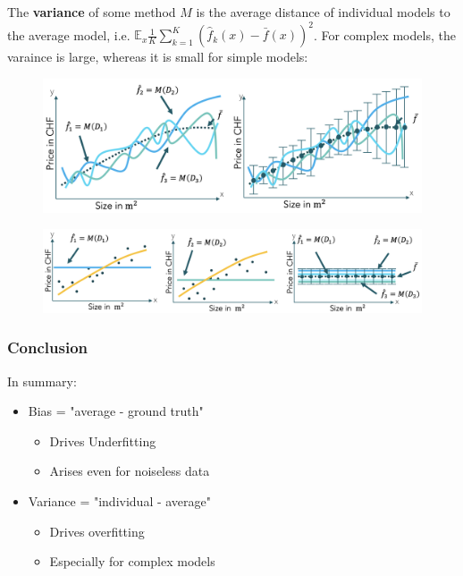 \documentclass[a4paper]{extarticle}
\begin{document}
The \textbf{variance} of some method \(M\) is the average distance of individual models to the average model, i.e. \(\mathbb{E}_x \frac{1}{K}\sum_{k = 1}^K (\hat{f}_k(x) - \bar{f}(x))^2\). For complex models, the varaince is large, whereas it is small for simple models:

\begin{figure}[H]
    \includegraphics[width=15cm]{../images/IntroML_Fig3-19}
    \centering
\end{figure}

\begin{figure}[H]
    \includegraphics[width=15cm]{../images/IntroML_Fig3-20}
    \centering
\end{figure}

\subsubsection{Conclusion}

In summary:

\begin{itemize}
    \item Bias = "average - ground truth"
    \begin{itemize}
        \item Drives Underfitting
        \item Arises even for noiseless data
    \end{itemize}
    \item Variance = "individual - average"
    \begin{itemize}
        \item Drives overfitting
        \item Especially for complex models
    \end{itemize}
\end{itemize}
\end{document}

